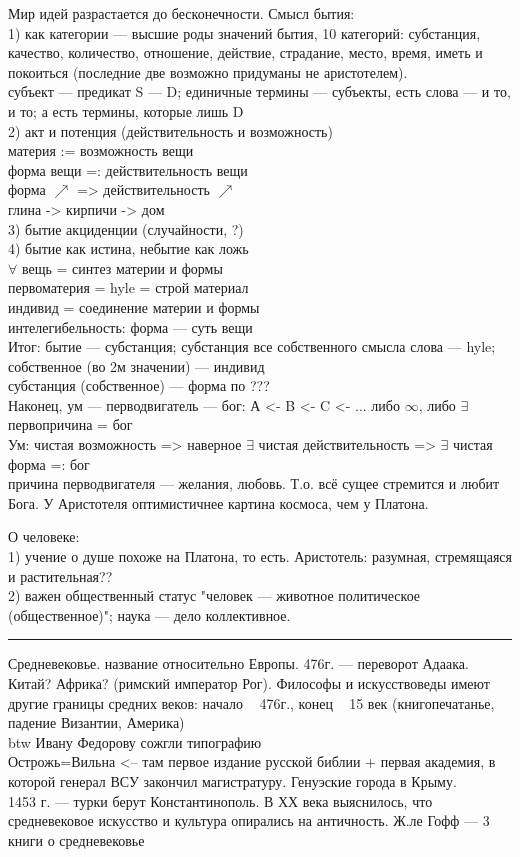 \documentclass[a4paper,12pt]{article}
\begin{document}
Мир идей разрастается до бесконечности. Смысл бытия:\\
1) как категории --- высшие роды значений бытия, 10 категорий: субстанция, качество, количество, отношение, действие, страдание, место, время, иметь и покоиться (последние две возможно придуманы не аристотелем).\\
субъект --- предикат S --- D; единичные термины --- субъекты, есть слова --- и то, и то; а есть термины, которые лишь D\\
2) акт и потенция (действительность и возможность)\\
материя := возможность вещи\\
форма вещи =: действительность вещи\\
форма $\nearrow$ => действительность $\nearrow$\\
глина ->  кирпичи -> дом \\
3) бытие акциденции (случайности, ?)\\
4) бытие как истина, небытие как ложь\\
$\forall$ вещь = синтез материи и формы\\
первоматерия = hyle = строй материал\\
индивид = соединение материи и формы \\
интелегибельность: форма --- суть вещи\\
Итог: бытие --- субстанция; субстанция все собственного смысла слова --- hyle; \\
собственное (во 2м значении) --- индивид\\
субстанция (собственное) --- форма по ???\\
Наконец, ум --- перводвигатель --- бог:
А <- B <- C <- ... либо $\infty$, либо $\exists$ первопричина = бог\\
Ум: чистая возможность => наверное $\exists$ чистая действительность =>  $\exists$ чистая форма =: бог\\
причина перводвигателя --- желания, любовь. Т.о. всё сущее стремится и любит Бога. У Аристотеля оптимистичнее картина космоса, чем у Платона.

О человеке:\\
1) учение о душе похоже на Платона, то есть. Аристотель: разумная, стремящаяся и растительная??\\
2) важен общественный статус "человек --- животное политическое (общественное)"; наука --- дело коллективное.\hrule

Средневековье. название относительно Европы. 476г. --- переворот Адаака. Китай? Африка? (римский император Рог). Философы и искусствоведы имеют другие границы средних веков: начало ~ 476г., конец ~ 15 век (книгопечатанье, падение Византии, Америка)\\
btw Ивану Федорову сожгли типографию\\
Острожь=Вильна <-- там первое издание русской библии + первая академия, в которой генерал ВСУ закончил магистратуру. Генуэские города в Крыму.\\
1453 г. --- турки берут Константинополь. В ХХ века выяснилось, что средневековое искусство и культура опирались на античность. Ж.ле Гофф --- 3 книги о средневековье
\end{document}
